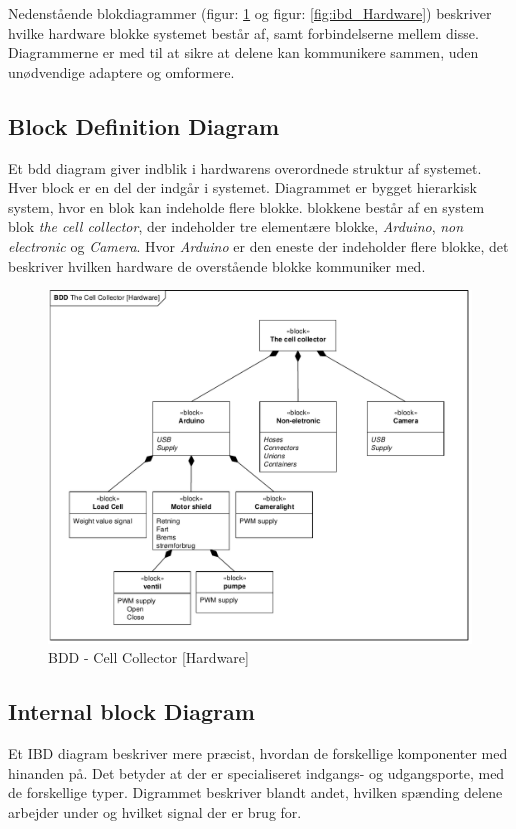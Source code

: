 Nedenstående blokdiagrammer (figur: \ref{fig:bdd_Hardware} og figur: \ref{fig:ibd_Hardware}) beskriver hvilke hardware blokke systemet består af, samt forbindelserne mellem disse. Diagrammerne er med til at sikre at delene kan kommunikere sammen, uden unødvendige adaptere og omformere. 

 
 
 
 
 \newpage
\subsection{Block Definition Diagram} 
Et bdd diagram giver indblik i hardwarens overordnede struktur af systemet. Hver block er en del der indgår i systemet. Diagrammet er bygget hierarkisk system, hvor en blok kan indeholde flere blokke. blokkene består af en system blok \textit{the cell collector}, der indeholder tre elementære blokke, \textit{Arduino}, \textit{non electronic} og \textit{Camera}. Hvor \textit{Arduino} er den eneste der indeholder flere blokke, det beskriver hvilken hardware de overstående blokke kommuniker med.


\begin{figure}[H]
	\centering
	\includegraphics[width=1\textwidth]{pdf/BDD_Hardware_4315_cropped.pdf}
	\caption{BDD - Cell Collector [Hardware]}
	\label{fig:bdd_Hardware}
\end{figure}


\subsection{Internal block Diagram} 
Et IBD diagram beskriver mere præcist, hvordan de forskellige komponenter med hinanden på. Det betyder at der er specialiseret indgangs- og udgangsporte, med de forskellige typer. Digrammet beskriver blandt andet, hvilken spænding delene arbejder under og hvilket signal der er brug for.


